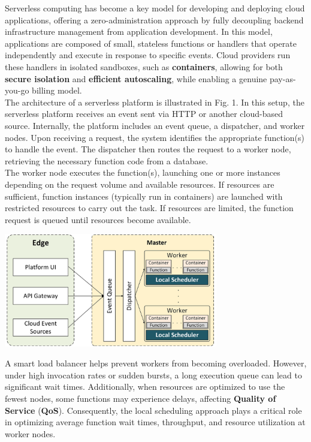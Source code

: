 Serverless computing has become a key model for developing and deploying cloud applications, offering a zero-administration approach by fully decoupling backend infrastructure management from application development. In this model, applications are composed of small, stateless functions or handlers that operate independently and execute in response to specific events. Cloud providers run these handlers in isolated sandboxes, such as \textbf{containers}, allowing for both \textbf{secure isolation} and \textbf{efficient autoscaling}, while enabling a genuine pay-as-you-go billing model.\vspace{14pt}\\
The architecture of a serverless platform is illustrated in Fig. 1. In this setup, the serverless platform receives an event sent via HTTP or another cloud-based source. Internally, the platform includes an event queue, a dispatcher, and worker nodes. Upon receiving a request, the system identifies the appropriate function(s) to handle the event. The dispatcher then routes the request to a worker node, retrieving the necessary function code from a database.\vspace{14pt}\\
The worker node executes the function(s), launching one or more instances depending on the request volume and available resources. If resources are sufficient, function instances (typically run in containers) are launched with restricted resources to carry out the task. If resources are limited, the function request is queued until resources become available.\vspace{10pt}\\
\begin{center}
    \includegraphics[width=0.7\textwidth]{img/arch.png}
    \vspace{10pt}
\end{center}
A smart load balancer helps prevent workers from becoming overloaded. However, under high invocation rates or sudden bursts, a long execution queue can lead to significant wait times. Additionally, when resources are optimized to use the fewest nodes, some functions may experience delays, affecting \textbf{Quality of Service} (\textbf{QoS}). Consequently, the local scheduling approach plays a critical role in optimizing average function wait times, throughput, and resource utilization at worker nodes.\vspace{14pt}\\
